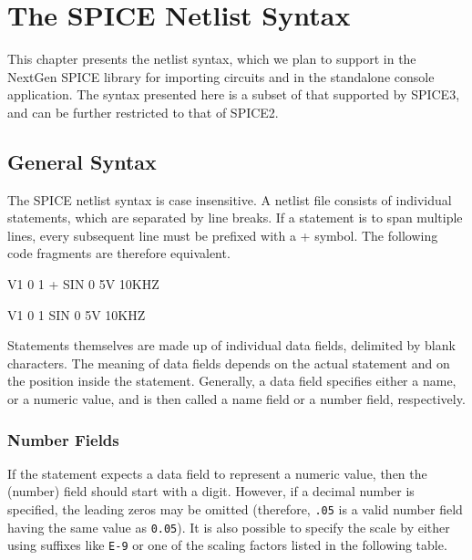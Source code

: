\chapter{The SPICE Netlist Syntax}
\label{chap:spicecode}

This chapter presents the netlist syntax, which we plan to support in the NextGen SPICE library for importing circuits and in the standalone console application. The syntax presented here is a subset of that supported by SPICE3, and can be further restricted to that of SPICE2.

\section{General Syntax}
\label{chap:spicecode:general}
The SPICE netlist syntax is case insensitive. A netlist file consists of individual statements, which are separated by line breaks. If a statement is to span multiple lines, every subsequent line must be prefixed with a + symbol. The following code fragments are therefore equivalent. 

\begin{code}
V1 0 1
+ SIN 0 5V 10KHZ
\end{code}

\begin{code}
V1 0 1 SIN 0 5V 10KHZ
\end{code}

Statements themselves are made up of individual data fields, delimited by blank characters. The meaning of data fields depends on the actual statement and on the position inside the statement. Generally, a data field specifies either a name, or a numeric value, and is then called a name field or a number field, respectively.

\subsection{Number Fields}
\label{chap:spicecode:numfield}
If the statement expects a data field to represent a numeric value, then the (number) field should start with a digit. However, if a decimal number is specified, the leading zeros may be omitted (therefore, \texttt{.05} is a valid number field having the same value as \texttt{0.05}). It is also possible to specify the scale by either using suffixes like \texttt{E-9} or one of the scaling factors listed in the following table.

